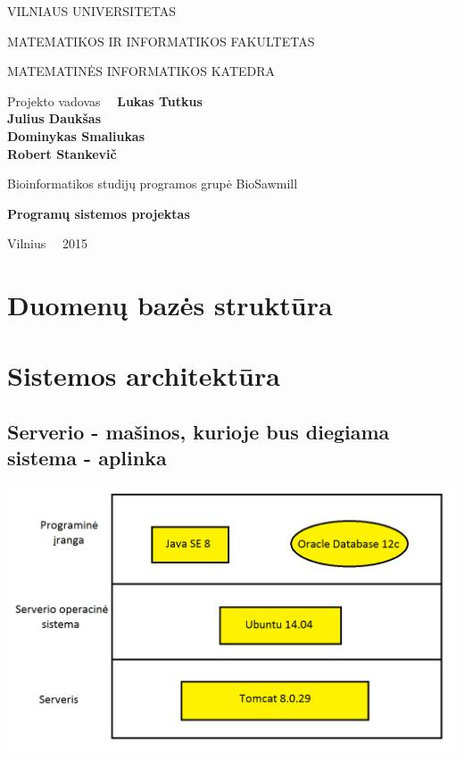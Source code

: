 \documentclass[a4paper,12pt]{article}
\begin{document}
\graphicspath{ {/} }

\renewcommand{\cftdot}{.}	
\renewcommand{\cftsecleader}{\cftdotfill{\cftdotsep}}

\thispagestyle{empty} %


\begin{center}
 VILNIAUS UNIVERSITETAS 
 
MATEMATIKOS IR INFORMATIKOS FAKULTETAS

MATEMATINĖS INFORMATIKOS KATEDRA

\vspace{4cm}

Projekto vadovas \ \ \textbf{Lukas Tutkus} \\
\textbf{Julius Daukšas} \\
\textbf{Dominykas Smaliukas} \\
\textbf{Robert Stankevič} \\

\vspace{0.2cm}

Bioinformatikos studijų programos grupė BioSawmill



\vspace{3cm}
\textbf{\Large Programų sistemos projektas}\\


\vfill

Vilnius \ \  2015
\end{center}



\clearpage

\tableofcontents
\clearpage

\section{Duomenų bazės struktūra}


\section{Sistemos architektūra}
\subsection{Serverio - mašinos, kurioje bus diegiama sistema - aplinka}
\includegraphics[scale=0.5]{architektura1}
\end{document}
